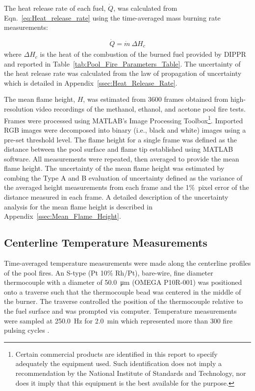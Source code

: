 \documentclass[12pt]{article}
\begin{document}
The heat release rate of each fuel, $\dot{Q}$, was calculated from Eqn.~\ref{eq:Heat_release_rate} using the time-averaged mass burning rate measurements:

\begin{equation}\label{eq:Heat_release_rate}
\dot{Q}= \dot{m}~\Delta H_{c}
\end{equation}
where $\Delta H_{c}$ is the heat of the combustion of the burned fuel provided by DIPPR\textsuperscript{\textregistered}~\cite{Dippr} and reported in Table~\ref{tab:Pool_Fire_Parameters_Table}. The uncertainty of the heat release rate was calculated from the law of propagation of uncertainty which is detailed in Appendix~\ref{ssec:Heat_Release_Rate}.

The mean flame height, $H$, was estimated from 3600 frames obtained from high-resolution video recordings of the methanol, ethanol, and acetone pool fire tests. Frames were processed using MATLAB’s Image Processing Toolbox\footnote{\label{fn:product} Certain commercial products are identified in this report to specify adequately the equipment used. Such identification does not imply a recommendation by the National Institute of Standards and Technology, nor does it imply that this equipment is the best available for the purpose.}. Imported RGB images were decomposed into binary (i.e., black and white) images using a pre-set threshold level. The flame height for a single frame was defined as the distance between the pool surface and flame tip established using MATLAB software. All measurements were repeated, then averaged to provide the mean flame height. The uncertainty of the mean flame height was estimated by combing the Type A and B evaluation of uncertainty defined as the variance of the averaged height measurements from each frame and the 1\%~pixel error of the distance measured in each frame. A detailed description of the uncertainty analysis for the mean flame height is described in Appendix~\ref{ssec:Mean_Flame_Height}.

\subsection{Centerline Temperature Measurements}
\label{ssec:Temperature_Measurements}

Time-averaged temperature measurements were made along the centerline profiles of the pool fires. An S-type (Pt 10\% Rh/Pt), bare-wire, fine diameter thermocouple with a diameter of \SI{50.0}{\micro\metre} (OMEGA P10R-001) was positioned onto a traverse such that the thermocouple bead was centered in the middle of the burner. The traverse controlled the position of the thermocouple relative to the fuel surface and was prompted via computer. Temperature measurements were sampled at \SI{250.0}{Hz} for \SI{2.0}{min} which represented more than 300 fire pulsing cycles \cite{Wang2019}. 
\end{document}
